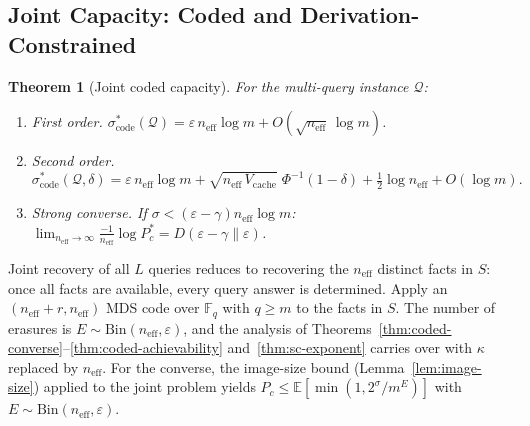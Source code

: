 \documentclass[journal]{IEEEtran}
\makeatletter
\newtheorem{theorem}{Theorem}[section]
\numberwithin{equation}{section}
\renewenvironment{proof}[1][\proofname]{\par
  \pushQED{\qed}%
  \normalfont \topsep6\p@\@plus6\p@\relax
  \trivlist
  \item[\hskip\labelsep
        \itshape
    #1\@addpunct{.}]\ignorespaces
}{%
  \popQED\endtrivlist\@endpefalse
}
\makeatother
\begin{document}
\subsection{Joint Capacity: Coded and Derivation-Constrained}
\label{subsec:mq-capacity}

\begin{theorem}[Joint coded capacity]
\label{thm:joint-coded-mq}
For the multi-query instance $\mathcal Q$:
\begin{enumerate}[label=\textup{(\Roman*)}]
\item \emph{First order.}\;
$\sigma^*_{\mathrm{code}}(\mathcal Q)
=\varepsilon\,n_{\mathrm{eff}}\log m
+O(\sqrt{n_{\mathrm{eff}}}\,\log m)$.

\item \emph{Second order.}\;
\begin{equation}\label{eq:joint-coded-2nd-mq}
  \sigma^*_{\mathrm{code}}(\mathcal Q,\delta)
  =\varepsilon\,n_{\mathrm{eff}}\log m
  +\sqrt{n_{\mathrm{eff}}\,V_{\mathrm{cache}}}\;
    \Phi^{-1}(1{-}\delta)
  +\tfrac{1}{2}\log n_{\mathrm{eff}}
  +O(\log m).
\end{equation}

\item \emph{Strong converse.}\;
If $\sigma<(\varepsilon{-}\gamma)n_{\mathrm{eff}}\log m$:
$\lim_{n_{\mathrm{eff}}\to\infty}
\frac{-1}{n_{\mathrm{eff}}}\log P_c^*
=D(\varepsilon{-}\gamma\|\varepsilon)$.
\end{enumerate}
\end{theorem}

\begin{proof}
Joint recovery of all $L$ queries reduces to recovering the
$n_{\mathrm{eff}}$ distinct facts in $S$: once all facts are
available, every query answer is determined.
Apply an $(n_{\mathrm{eff}}{+}r,n_{\mathrm{eff}})$ MDS code
over $\mathbb F_q$ with $q\ge m$ to the facts in $S$.
The number of erasures is
$E\sim\mathrm{Bin}(n_{\mathrm{eff}},\varepsilon)$, and the
analysis of
Theorems~\ref{thm:coded-converse}--\ref{thm:coded-achievability}
and~\ref{thm:sc-exponent} carries over with $\kappa$ replaced
by $n_{\mathrm{eff}}$.
For the converse, the image-size bound
(Lemma~\ref{lem:image-size}) applied to the joint problem
yields
$P_c\le\mathbb E[\min(1,2^\sigma/m^E)]$ with
$E\sim\mathrm{Bin}(n_{\mathrm{eff}},\varepsilon)$.
\end{proof}
\end{document}
